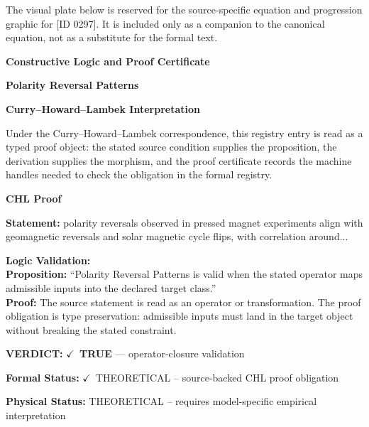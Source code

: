 \begingroup\footnotesize\sloppy
The visual plate below is reserved for the source-specific equation and progression graphic for [ID 0297]. It is included only as a companion to the canonical equation, not as a substitute for the formal text.
\par\endgroup
\ifTZPDarkEdition
{}
\fi

\clearpage
\begingroup\tzpsupportsetup
\noindent\textbf{\fontsize{10.8pt}{12.8pt}\selectfont [ID 0297] Constructive Logic and Proof Certificate}\par
\noindent\textbf{\fontsize{10pt}{12pt}\selectfont Polarity Reversal Patterns}\par
\vspace{0.45em}
\begingroup
\footnotesize
\setlength{\parskip}{0.22em}
\setlength{\parindent}{0pt}
\noindent\textbf{Curry--Howard--Lambek Interpretation}\par
Under the Curry--Howard--Lambek correspondence, this registry entry is read as a typed proof
object: the stated source condition supplies the proposition, the derivation supplies the
morphism, and the proof certificate records the machine handles needed to check the obligation
in the formal registry.

\vspace{0.45em}
\noindent\textbf{CHL Proof}\par
\textbf{Statement:} polarity reversals observed in pressed magnet experiments align with geomagnetic
reversals and solar magnetic cycle flips, with correlation around...

\textbf{Logic Validation:}\\
\textbf{Proposition:} ``Polarity Reversal Patterns is valid when the stated operator maps admissible inputs into
the declared target class.''\\
\textbf{Proof:} The source statement is read as an operator or transformation. The proof obligation is
type preservation: admissible inputs must land in the target object without breaking the
stated constraint.

\textbf{VERDICT:} \ensuremath{\checkmark}\ \textbf{TRUE} --- operator-closure validation

\textbf{Formal Status:} \ensuremath{\checkmark}\ THEORETICAL -- source-backed CHL proof obligation

\textbf{Physical Status:} THEORETICAL -- requires model-specific empirical interpretation
\par\vspace{0.45em}
\par
\ifTZPDarkEdition
{}
\fi
\endgroup
\endgroup
